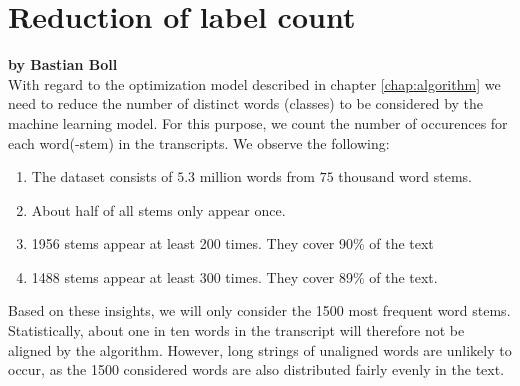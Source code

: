 
\section{Reduction of label count}

\textbf{by Bastian Boll} \\

With regard to the optimization model described in chapter \ref{chap:algorithm} we need to reduce the number of distinct words (classes) to be considered by the machine learning model. For this purpose, we count the number of occurences for each word(-stem) in the transcripts. We observe the following:
\begin{enumerate}
	\item The dataset consists of $5.3$ million words from $75$ thousand word stems.
	\item About half of all stems only appear once.
	\item 1956 stems appear at least 200 times. They cover 90\% of the text
	\item 1488 stems appear at least 300 times. They cover 89\% of the text.
\end{enumerate}
Based on these insights, we will only consider the 1500 most frequent word stems. Statistically, about one in ten words in the transcript will therefore not be aligned by the algorithm. However, long strings of unaligned words are unlikely to occur, as the 1500 considered words are also distributed fairly evenly in the text. 
